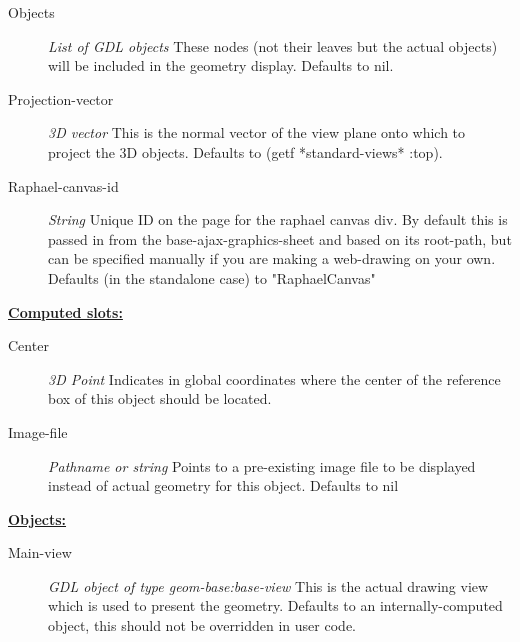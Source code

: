 \documentclass [11pt]{book}
\begin{document}
\begin{itemize}
\begin{description}
\item [Objects]
\emph{List of GDL objects} These nodes (not their leaves but the actual objects) will be included in the geometry display. Defaults to nil.


\item [Projection-vector]
\emph{3D vector} This is the normal vector of the view plane onto which to project the 3D objects. Defaults to (getf *standard-views* :top).


\item [Raphael-canvas-id]
\emph{String} Unique ID on the page for the raphael canvas div. By default this is passed in
from the base-ajax-graphics-sheet and based on its root-path, but can be specified manually
if you are making a web-drawing on your own. Defaults (in the standalone case) to "RaphaelCanvas"


\end{description}






\textbf{
\underline{Computed slots:}}

\begin{description}

\item [Center]
\emph{3D Point} Indicates in global coordinates where the center of the reference
box of this object should be located.


\item [Image-file]
\emph{Pathname or string} Points to a pre-existing image file to be displayed instead of actual geometry for this object. Defaults to nil


\end{description}






\textbf{
\underline{Objects:}}

\begin{description}

\item [Main-view]
\emph{GDL object of type geom-base:base-view} This is the actual drawing view which is used to present the geometry. Defaults to an
internally-computed object, this should not be overridden in user code.


\end{description}







\end{itemize}
\end{document}

